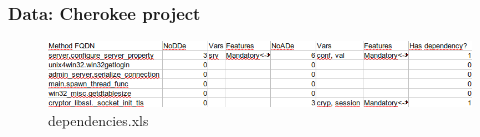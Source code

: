 \begin{frame}
	\frametitle{Data: Cherokee project}
	\begin{figure}
		\centering
		\includegraphics[scale=0.4]{images/dependencies}
		\caption{dependencies.xls}
	\end{figure}
\end{frame}